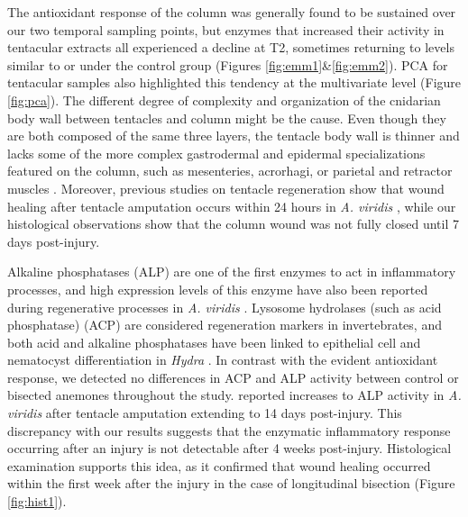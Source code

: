 \documentclass[final,3p,times,authoryear]{elsarticle}
\begin{document}
The antioxidant response of the column was generally found to be sustained over our two temporal sampling points, but enzymes that increased their activity in tentacular extracts all experienced a decline at T2, sometimes returning to levels similar to or under the control group (Figures \ref{fig:emm1}\&\ref{fig:emm2}). PCA for tentacular samples also highlighted this tendency at the multivariate level (Figure \ref{fig:pca}). The different degree of complexity and organization of the cnidarian body wall between tentacles and column might be the cause. Even though they are both composed of the same three layers, the tentacle body wall is thinner and lacks some of the more complex gastrodermal and epidermal specializations featured on the column, such as mesenteries, acrorhagi, or parietal and retractor muscles \citep{Harrison1991, Jahnel2014}. Moreover, previous studies on tentacle regeneration show that wound healing after tentacle amputation occurs within 24 hours in \textit{A. viridis} \citep{Parisi2021, LaCorte2023}, while our histological observations show that the column wound was not fully closed until 7 days post-injury.

Alkaline phosphatases (ALP) are one of the first enzymes to act in inflammatory processes, and high expression levels of this enzyme have also been reported during regenerative processes in \textit{A. viridis} \citep{Abe2001, Mauro2021, Parisi2021}. Lysosome hydrolases (such as acid phosphatase) (ACP) are considered regeneration markers in invertebrates, and both acid and alkaline phosphatases have been linked to epithelial cell and nematocyst differentiation in \textit{Hydra} \citep{Lentz1962, Orlando1991, Trapani2016, Konada2020}. In contrast with the evident antioxidant response, we detected no differences in ACP and ALP activity between control or bisected anemones throughout the study. \citet{Parisi2021} reported increases to ALP activity in \textit{A. viridis} after tentacle amputation extending to 14 days post-injury. This discrepancy with our results suggests that the enzymatic inflammatory response occurring after an injury is not detectable after 4 weeks post-injury. Histological examination supports this idea, as it confirmed that wound healing occurred within the first week after the injury in the case of longitudinal bisection (Figure \ref{fig:hist1}).
\end{document}
